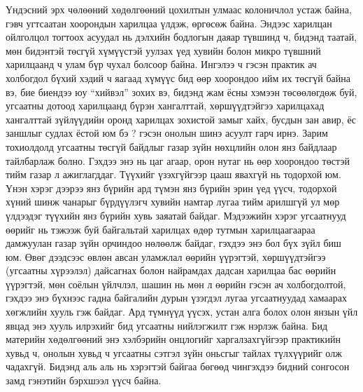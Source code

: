 Үндэсний эрх чөлөөний хөдөлгөөний цохилтын улмаас колоничлол устаж байна, гэвч угтсаатан хоорондын харилцаа үлдэж, өргөсөж байна. Эндээс харилцан ойлголцол тогтоох асуудал нь дэлхийн бодлогын даяар түвшинд ч, бидэнд таатай, мөн бидэнтэй төсгүй хүмүүстэй уулзах үед хувийн болон микро түвшний харилцаанд ч улам бүр чухал болсоор байна. Ингэлээ ч гэсэн практик ач холбогдол бүхий хэдий ч яагаад хүмүүс бид өөр хоорондоо ийм их төсгүй байна вэ, бие биендээ юу “хийвэл” зохих вэ, бидэнд жам ёсны хэмээн төсөөлөгдөж буй, угсаатны дотоод харилцаанд бүрэн хангалттай, хөршүүдтэйгээ харилцахад хангалттай зүйлүүдийн оронд харилцах зохистой замыг хайх, бусдын зан авир, ёс заншлыг судлах ёстой юм бэ ? гэсэн онолын шинэ асуулт гарч ирнэ. Зарим тохиолдолд угсаатны төсгүй байдлыг газар зүйн нөхцлийн олон янз байдлаар тайлбарлаж болно. Гэхдээ энэ нь цаг агаар, орон нутаг нь өөр хоорондоо төстэй тийм газар л ажиглагддаг. Түүхийг үзэхгүйгээр цааш явахгүй нь тодорхой юм.
Үнэн хэрэг дээрээ янз бүрийн ард түмэн янз бүрийн эрин үед үүсч, тодорхой хүний шинж чанарыг бүрдүүлэгч хувийн намтар лугаа тийм арилшгүй ул мөр үлдээдэг түүхийн янз бүрийн хувь заяатай байдаг. Мэдээжийн хэрэг угсаатнууд өөрийг нь тэжээж буй байгальтай харилцах өдөр тутмын харилцаагаараа дамжуулан газар зүйн орчиндоо нөлөөлж байдаг, гэхдээ энэ бол бүх зүйл биш юм. Өвөг дээдсээс өвлөн авсан уламжлал өөрийн үүрэгтэй, хөршүүдтэйгээ (угсаатны хүрээлэл) дайсагнах болон найрамдах дадсан харилцаа бас өөрийн үүрэгтэй, мөн соёлын үйлчлэл, шашин нь мөн л өөрийн гэсэн ач холбогдолтой, гэхдээ энэ бүхнээс гадна байгалийн дурын үзэгдэл лугаа угсаатнуудад хамаарах хөгжлийн хууль гэж байдаг. Ард түмнүүд үүсэх, устан алга болох олон янзын үйл явцад энэ хууль илрэхийг бид угсаатны нийлэгжилт гэж нэрлэж байна.
Бид материйн хөдөлгөөний энэ хэлбэрийн онцлогийг харгалзахгүйгээр практикийн хувьд ч, онолын хувьд ч угсаатны сэтгэл зүйн оньсгыг тайлах түлхүүрийг олж чадахгүй. Бидэнд аль аль нь хэрэгтэй байгаа бөгөөд чингэхдээ бидний сонгосон замд гэнэтийн бэрхшээл үүсч байна.
